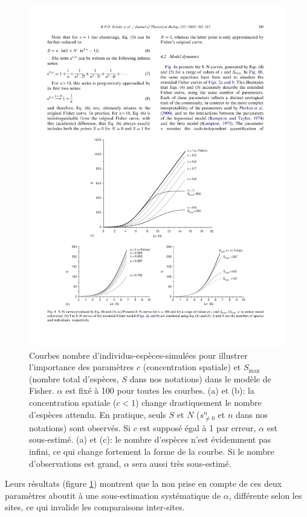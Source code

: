 \documentclass[
  11pt,
  french,
  a4paper,
  extrafontsizes,onecolumn,openright
  ]{memoir}
\begin{document}
\scriptsize

\begin{figure}

{\centering \includegraphics[width=0.8\linewidth]{images/Schulte2005b} 

}

\caption{Courbes nombre d'individus-espèces-simulées pour illustrer l'importance des paramètres \(c\) (concentration spatiale) et \(S_{\max}\) (nombre total d'espèces, \(S\) dans nos notations) dans le modèle de Fisher. \(\alpha\) est fixé à 100 pour toutes les courbes. (a) et (b): la concentration spatiale (\(c<1\)) change drastiquement le nombre d'espèces attendu. En pratique, seuls \(S\) et \(N\) (\(s^{n}_{\ne 0}\) et \(n\) dans nos notations) sont observés. Si \(c\) est supposé égal à 1 par erreur, \(\alpha\) est sous-estimé. (a) et (c): le nombre d'espèces n'est évidemment pas infini, ce qui change fortement la forme de la courbe. Si le nombre d'observations est grand, \(\alpha\) sera aussi très sous-estimé.}\label{fig:Schulte2005b}
\end{figure}

\normalsize

Leurs résultats (figure \ref{fig:Schulte2005b}) montrent que la non prise en compte de ces deux paramètres aboutit à une sous-estimation systématique de \(\alpha\), différente selon les sites, ce qui invalide les comparaisons inter-sites.
\end{document}
